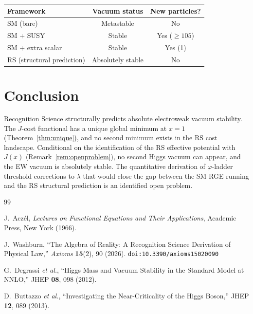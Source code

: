 \documentclass[12pt,a4paper]{article}
\theoremstyle{definition}
\theoremstyle{remark}
\begin{document}
\begin{center}
\renewcommand{\arraystretch}{1.3}
\begin{tabular}{@{}lcc@{}}
\toprule
\textbf{Framework} & \textbf{Vacuum status} &
\textbf{New particles?} \\
\midrule
SM (bare) & Metastable & No \\
SM + SUSY & Stable & Yes ($\geq 105$) \\
SM + extra scalar & Stable & Yes (1) \\
RS (structural prediction) & Absolutely stable & No \\
\bottomrule
\end{tabular}
\end{center}

\section{Conclusion}
\label{sec:conclusion}

Recognition Science structurally predicts absolute electroweak vacuum
stability.  The $J$-cost functional has a unique global minimum at $x = 1$
(Theorem~\ref{thm:unique}), and no second minimum exists in the RS cost
landscape.  Conditional on the identification of the RS effective potential
with $J(x)$ (Remark~\ref{rem:openproblem}), no second Higgs vacuum can
appear, and the EW vacuum is absolutely stable.  The quantitative
derivation of $\varphi$-ladder threshold corrections to $\lambda$ that
would close the gap between the SM RGE running and the RS structural
prediction is an identified open problem.

\begin{thebibliography}{99}

J.~Acz\'el, \emph{Lectures on Functional Equations and Their Applications},
Academic Press, New York (1966).

J.~Washburn, ``The Algebra of Reality: A Recognition Science Derivation
of Physical Law,'' \emph{Axioms} \textbf{15}(2), 90 (2026).
\texttt{doi:10.3390/axioms15020090}

G.~Degrassi \textit{et al.}, ``Higgs Mass and Vacuum Stability in
the Standard Model at NNLO,'' JHEP \textbf{08}, 098 (2012).

D.~Buttazzo \textit{et al.}, ``Investigating the Near-Criticality
of the Higgs Boson,'' JHEP \textbf{12}, 089 (2013).

\end{thebibliography}
\end{document}

